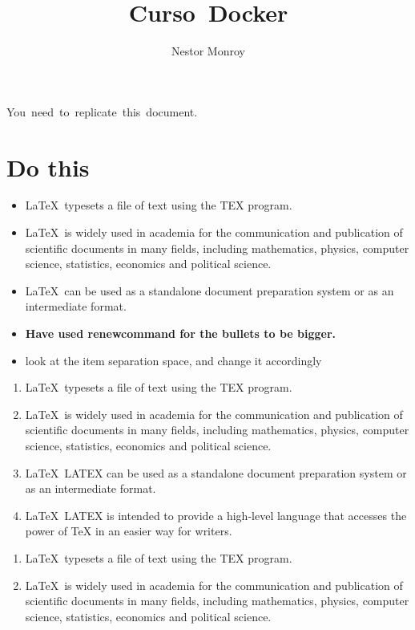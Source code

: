 \documentclass{article}
\title{
    \huge{\bf \mbox{Curso Docker} }
}
\author{\huge Nestor Monroy}
\begin{document}
    \addtolength{\topmargin}{2in}
    \maketitle
    \thispagestyle{empty}
    \clearpage
    \newpage
    \restoregeometry
    \tableofcontents
    \newpage
    \mbox{You need to replicate this document.}
    \section{Do this}\label{doThis}
        \begin{itemize}
            \item \LaTeX\ typesets a file of text using the TEX program.
            \item \LaTeX\ is widely used in academia for the communication and publication of scientific documents in many fields, including mathematics, physics, computer science, statistics, economics and political science.
            \item \LaTeX\ can be used as a standalone document preparation system or as an intermediate format.
            \item {\bf Have used renewcommand for the bullets to be bigger.}
            \item look at the item separation space, and change it accordingly
        \end{itemize}
        \begin{enumerate}[label=\roman*]
            \item \LaTeX\ typesets a file of text using the TEX program.
            \item \LaTeX\ is widely used in academia for the communication and publication of scientific documents in many fields, including mathematics, physics, computer science, statistics, economics and political science.
            \item \LaTeX\ LATEX can be used as a standalone document preparation system or as an intermediate format.
            \item \LaTeX\ LATEX is intended to provide a high-level language that accesses the power of TeX in an easier way for writers.
        \end{enumerate}
        \begin{enumerate}[label=(\alph*)]
            \item \LaTeX\ typesets a file of text using the TEX program.
            \item \LaTeX\ is widely used in academia for the communication and publication of scientific documents in many fields, including mathematics, physics, computer science, statistics, economics and political science.
        \end{enumerate}
        \newpage
\end{document}
